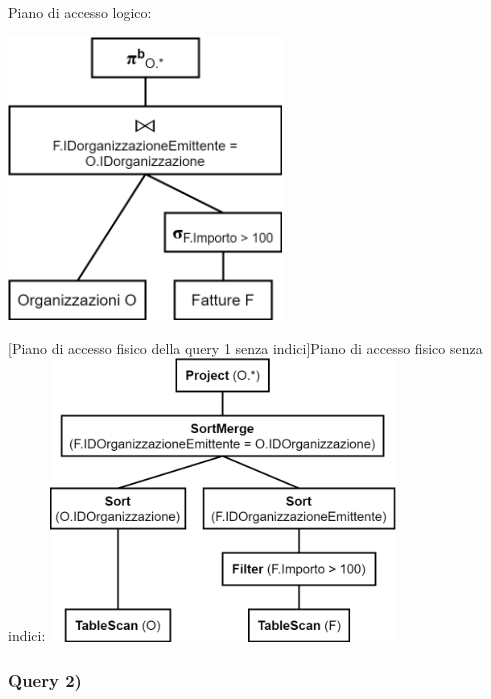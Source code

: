 \documentclass[a4paper,12pt]{article}
\begin{document}
\vspace{-0.3cm}\hspace{-0.7cm}
\begin{minipage}{\textwidth}
\begin{multicols}{2}

\null \vfill
Piano di accesso logico:

\vspace{0.3cm}\includegraphics[height=7.5cm]{ Albero logico 1.png }
\vfill \null

\columnbreak

 [Piano di accesso fisico della query 1 senza indici]{Piano di accesso fisico senza indici:}
\includegraphics[height=7.5cm]{ Albero fisico 1.png }
\end{multicols}
\end{minipage}

 \subsubsection{ Query 2) }
\end{document}
